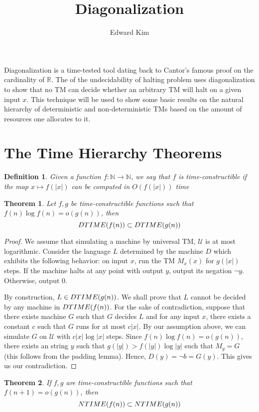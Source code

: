 \documentclass[12pt]{article}
\title{Diagonalization}
\author{Edward Kim}
\newtheorem{theorem}{Theorem}[section]
\newtheorem{definition}{Definition}[section]
\begin{document}
\maketitle
\hrulefill

Diagonalization is a time-tested tool dating back to Cantor's famous proof on the cardinality of $\mathbb{R}$. The of the undecidability of halting problem uses diagonalization to show that no TM can decide whether an arbitrary TM will halt on a given input $x$. This technique will be used to show some basic results on the natural hierarchy of deterministic and non-deterministic TMs based on the amount of resources one allocates to it.

\section{The Time Hierarchy Theorems} 

\begin{definition}
Given a function $f: \mathbb{N} \rightarrow \mathbb{N}$, we say that $f$ is time-constructible if the map $x \mapsto f(|x|)$ can be computed in $O(f(|x|))$ time
\end{definition}

\begin{theorem}
Let $f,g$ be time-constructible functions such that $f(n)\log f(n) = o(g(n))$, then
$$ \boldmath{DTIME}(f(n)) \subset \boldmath{DTIME}(g(n))$$
\end{theorem}	

\begin{proof}
	We assume that simulating a machine by universal TM, $\mathcal{U}$ is at most logarithmic. Consider the language $L$ determined by the machine $D$ which exhibits the following behavior: on input $x$, run the TM $M_x(x)$ for $g(|x|)$ steps. If the machine halts at any point with output $y$, output its negation $\neg y$. Otherwise, output 0. \par By construction, $L \in \boldmath{DTIME}(g(n))$. We shall prove that $L$ cannot be decided by any machine in $\boldmath{DTIME}(f(n))$. For the sake of contradiction, suppose that there exists machine $G$ such that $G$ decides $L$ and for any input $x$, there exists a constant $c$ such that $G$ runs for at most $c|x|$. By our assumption above, we can simulate $G$ on $\mathcal{U}$ with $c|x|\log|x|$ steps. Since $f(n)\log f(n) = o(g(n))$, there exists an string $y$ such that $g(|y|) > f(|y|) \log |y|$ such that $M_y = G$ (this follows from the padding lemma). Hence, $D(y) = \neg b = G(y)$. This gives us our contradiction.
\end{proof}

\begin{theorem}
If $f,g$ are time-constructible functions such that $f(n+1) = o(g(n))$, then
$$ \boldmath{NTIME}(f(n)) \subset \boldmath{NTIME}(g(n)) $$
\end{theorem}
\end{document}
